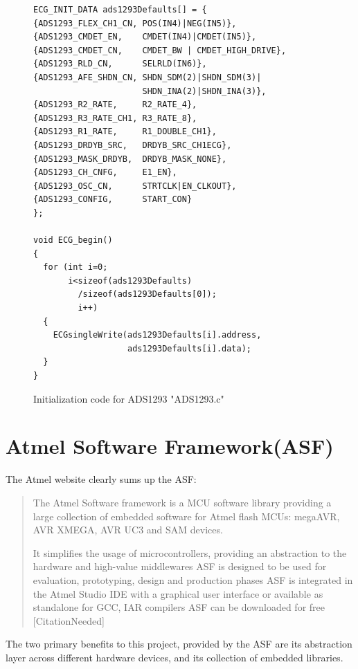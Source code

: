 \begin{figure}
	\begin{center}
		\label{fig:ADS1293_INIT}
\begin{lstlisting}[frame=single,morekeywords={ECG_INIT_DATA}]
ECG_INIT_DATA ads1293Defaults[] = {
{ADS1293_FLEX_CH1_CN, POS(IN4)|NEG(IN5)}, 
{ADS1293_CMDET_EN,    CMDET(IN4)|CMDET(IN5)},
{ADS1293_CMDET_CN,    CMDET_BW | CMDET_HIGH_DRIVE},
{ADS1293_RLD_CN,      SELRLD(IN6)},
{ADS1293_AFE_SHDN_CN, SHDN_SDM(2)|SHDN_SDM(3)|
                      SHDN_INA(2)|SHDN_INA(3)},
{ADS1293_R2_RATE,     R2_RATE_4},
{ADS1293_R3_RATE_CH1, R3_RATE_8},
{ADS1293_R1_RATE,     R1_DOUBLE_CH1},
{ADS1293_DRDYB_SRC,   DRDYB_SRC_CH1ECG},
{ADS1293_MASK_DRDYB,  DRDYB_MASK_NONE},
{ADS1293_CH_CNFG,     E1_EN},
{ADS1293_OSC_CN,      STRTCLK|EN_CLKOUT},
{ADS1293_CONFIG,      START_CON}
};

void ECG_begin()
{
  for (int i=0;
       i<sizeof(ads1293Defaults)
         /sizeof(ads1293Defaults[0]);
         i++)
  {
    ECGsingleWrite(ads1293Defaults[i].address,
                   ads1293Defaults[i].data);
  }
}
\end{lstlisting}
		\caption{Initialization code for ADS1293 "ADS1293.c"}
	\end{center}
\end{figure}



\section{Atmel Software Framework(ASF)}
The Atmel website clearly sums up the ASF:

\begin{quotation}
The Atmel Software framework is a MCU software library providing a large collection of embedded software for Atmel flash MCUs: megaAVR, AVR XMEGA, AVR UC3 and SAM devices.

It  simplifies the usage of microcontrollers, providing an abstraction to the hardware and high-value middlewares
ASF is designed to be used for evaluation, prototyping, design and production phases
ASF is integrated in the Atmel Studio IDE with a graphical user interface or available as standalone for GCC, IAR compilers
ASF can be downloaded for free [CitationNeeded]
\end{quotation} 

The two primary benefits to this project, provided by the ASF are its abstraction layer across different hardware devices, and its collection of embedded libraries.

